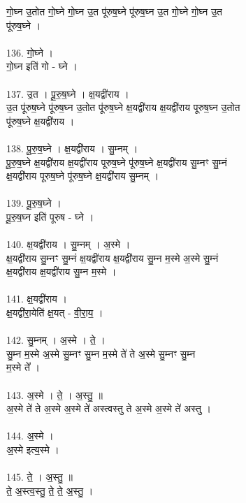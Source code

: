 गो॒घ्न उ॒तोत गो॒घ्ने गो॒घ्न उ॒त पू॑रुष॒घ्ने पू॑रुष॒घ्न उ॒त गो॒घ्ने गो॒घ्न उ॒त\\
पू॑रुष॒घ्ने ।\\
\\
136. गो॒घ्ने ।\\
गो॒घ्न इति॑ गो - घ्ने ।\\
\\
137. उ॒त । पू॒रु॒ष॒घ्ने । क्ष॒यद्वी॑राय ।\\
उ॒त पू॑रुष॒घ्ने पू॑रुष॒घ्न उ॒तोत पू॑रुष॒घ्ने क्ष॒यद्वी॑राय क्ष॒यद्वी॑राय पूरुष॒घ्न उ॒तोत\\
पू॑रुष॒घ्ने क्ष॒यद्वी॑राय ।\\
\\
138. पू॒रु॒ष॒घ्ने । क्ष॒यद्वी॑राय । सु॒म्नम् ।\\
पू॒रु॒ष॒घ्ने क्ष॒यद्वी॑राय क्ष॒यद्वी॑राय पूरुष॒घ्ने पू॑रुष॒घ्ने क्ष॒यद्वी॑राय सु॒म्नꣳ सु॒म्नं\\
क्ष॒यद्वी॑राय पूरुष॒घ्ने पू॑रुष॒घ्ने क्ष॒यद्वी॑राय सु॒म्नम् ।\\
\\
139. पू॒रु॒ष॒घ्ने ।\\
पू॒रु॒ष॒घ्न इति॑ पूरुष - घ्ने ।\\
\\
140. क्ष॒यद्वी॑राय । सु॒म्नम् । अ॒स्मे ।\\
क्ष॒यद्वी॑राय सु॒म्नꣳ सु॒म्नं क्ष॒यद्वी॑राय क्ष॒यद्वी॑राय सु॒म्न म॒स्मे अ॒स्मे सु॒म्नं\\
क्ष॒यद्वी॑राय क्ष॒यद्वी॑राय सु॒म्न म॒स्मे ।\\
\\
141. क्ष॒यद्वी॑राय ।\\
क्ष॒यद्वी॑रा॒येति॑ क्ष॒यत् - वी॒रा॒य॒ ।\\
\\
142. सु॒म्नम् । अ॒स्मे । ते॒ ।\\
सु॒म्न म॒स्मे अ॒स्मे सु॒म्नꣳ सु॒म्न म॒स्मे ते॑ ते अ॒स्मे सु॒म्नꣳ सु॒म्न\\
म॒स्मे ते᳚ ।\\
\\
143. अ॒स्मे । ते॒ । अ॒स्तु॒ ॥\\
अ॒स्मे ते॑ ते अ॒स्मे अ॒स्मे ते॑ अस्त्वस्तु ते अ॒स्मे अ॒स्मे ते॑ अस्तु ।\\
\\
144. अ॒स्मे ।\\
अ॒स्मे इत्य॒स्मे ।\\
\\
145. ते॒ । अ॒स्तु॒ ॥\\
ते॒ अ॒स्त्व॒स्तु॒ ते॒ ते॒ अ॒स्तु॒ ।\\
